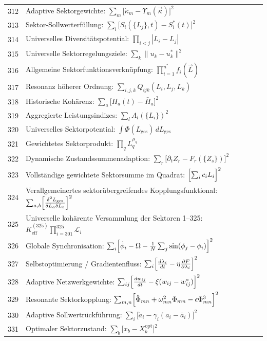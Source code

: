 \documentclass[11pt,a4paper]{article}
\begin{document}
\begin{longtable}{r l}
		312 & Adaptive Sektorgewichte: $\sum_m\bigl[\dot\kappa_m - \Upsilon_m(\vec\kappa)\bigr]^2$ \\
		313 & Sektor-Sollwerterfüllung: $\sum_i\bigl[S_i(\{L_j\},t) - S_i^*(t)\bigr]^2$ \\
		314 & Universelles Diversitätspotential: $\prod_{i<j}|L_i - L_j|$ \\
		315 & Universelle Sektorregelungsziele: $\sum_k\|u_k - u_k^*\|^2$ \\
		316 & Allgemeine Sektorfunktionsverknüpfung: $\prod_{i=1}^{n^*}f_i(\vec L)$ \\
		317 & Resonanz höherer Ordnung: $\sum_{i,j,k}Q_{ijk}(L_i,L_j,L_k)$ \\
		318 & Historische Kohärenz: $\sum_a\bigl[H_a(t) - \bar H_a\bigr]^2$ \\
		319 & Aggregierte Leistungsindizes: $\sum_l A_l(\{L_i\})^2$ \\
		320 & Universelles Sektorpotential: $\int\Phi(L_{\text{ges}})\,dL_{\text{ges}}$ \\
		321 & Gewichtetes Sektorprodukt: $\prod_q L_q^{\mu_q}$ \\
		322 & Dynamische Zustandssummenadaption: $\sum_r\bigl[\partial_t Z_r - F_r(\{Z_s\})\bigr]^2$ \\
		323 & Vollständige gewichtete Sektorsumme im Quadrat: $\Bigl[\sum_i c_i L_i\Bigr]^2$ \\
		324 & Verallgemeinertes sektorübergreifendes Kopplungsfunktional: $\sum_{a,b}\Bigl[\frac{\delta^2 L_{\text{ges}}}{\delta L_a\delta L_b}\Bigr]^2$ \\
		325 & Universelle kohärente Versammlung der Sektoren 1–325: $K^{(325)}_{\mathrm{eff}}\prod_{i=301}^{325}\mathcal{L}_i$ \\
		326 & Globale Synchronisation: $\sum_i\Bigl[\dot\phi_i - \Omega - \frac1N\sum_j\sin(\phi_j-\phi_i)\Bigr]^2$ \\
		327 & Selbstoptimierung / Gradientenfluss: $\sum_i\Bigl[\frac{d\lambda_i}{dt} - \eta\frac{\partial F}{\partial\lambda_i}\Bigr]^2$ \\
		328 & Adaptive Netzwerkgewichte: $\sum_{ij}\Bigl[\frac{dw_{ij}}{dt} - \xi(w_{ij}-w_{ij}^*)\Bigr]^2$ \\
		329 & Resonante Sektorkopplung: $\sum_{m,n}\Bigl[\ddot\Phi_{mn} + \omega_{mn}^2\Phi_{mn} - \epsilon\Phi_{mn}^3\Bigr]^2$ \\
		330 & Adaptive Sollwertrückführung: $\sum_i\bigl[\dot a_i - \gamma_i(a_i - \bar a_i)\bigr]^2$ \\
		331 & Optimaler Sektorzustand: $\sum_b\bigl[x_b - X_b^{\text{opt}}\bigr]^2$ \\

\end{longtable}
\end{document}
